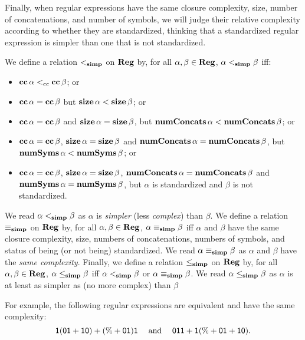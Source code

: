 Finally, when regular expressions have the same closure complexity,
size, number of concatenations, and number of symbols, we will judge
their relative complexity according to whether they are standardized,
thinking that a standardized regular expression is simpler than one
that is not standardized.

We define a relation $\mathrel{<_{\mathbf{simp}}}$ on $\mathbf{Reg}$ by, for all $\alpha,\beta\in\mathbf{Reg}$,
$\alpha\mathrel{<_{\mathbf{simp}}}\beta$ iff:
\begin{itemize}
\item $\mathbf{cc}\,\alpha \mathrel{<_{cc}} \mathbf{cc}\,\beta$; or

\item $\mathbf{cc}\,\alpha = \mathbf{cc}\,\beta$ but $\mathbf{size}\,\alpha < \mathbf{size}\,\beta$; or

\item $\mathbf{cc}\,\alpha = \mathbf{cc}\,\beta$ and $\mathbf{size}\,\alpha = \mathbf{size}\,\beta$,
  but $\mathbf{numConcats}\,\alpha < \mathbf{numConcats}\,\beta$; or

\item $\mathbf{cc}\,\alpha = \mathbf{cc}\,\beta$, $\mathbf{size}\,\alpha = \mathbf{size}\,\beta$
  and $\mathbf{numConcats}\,\alpha = \mathbf{numConcats}\,\beta$, but
  $\mathbf{numSyms}\,\alpha < \mathbf{numSyms}\,\beta$; or

\item $\mathbf{cc}\,\alpha = \mathbf{cc}\,\beta$, $\mathbf{size}\,\alpha = \mathbf{size}\,\beta$,
  $\mathbf{numConcats}\,\alpha = \mathbf{numConcats}\,\beta$ and $\mathbf{numSyms}\,\alpha =
  \mathbf{numSyms}\,\beta$, but $\alpha$ is standardized and $\beta$ is
  not standardized.
\end{itemize}

We read $\alpha\mathrel{<_{\mathbf{simp}}}\beta$ as $\alpha$ is \emph{simpler} (less
\emph{complex}) than $\beta$.  We define a relation $\mathrel{\equiv_{\mathbf{simp}}}$ on
$\mathbf{Reg}$ by, for all $\alpha,\beta\in\mathbf{Reg}$, $\alpha\mathrel{\equiv_{\mathbf{simp}}}\beta$ iff
$\alpha$ and $\beta$ have the same closure complexity, size, numbers
of concatenations, numbers of symbols, and status of being (or not
being) standardized.  We read $\alpha\mathrel{\equiv_{\mathbf{simp}}}\beta$ as $\alpha$ and
$\beta$ have the \emph{same complexity}.  Finally, we define a
relation $\mathrel{\leq_{\mathbf{simp}}}$ on $\mathbf{Reg}$ by, for all $\alpha,\beta\in\mathbf{Reg}$,
$\alpha\mathrel{\leq_{\mathbf{simp}}}\beta$ iff $\alpha\mathrel{<_{\mathbf{simp}}}\beta$ or
$\alpha\mathrel{\equiv_{\mathbf{simp}}}\beta$.  We read $\alpha\mathrel{\leq_{\mathbf{simp}}}\beta$ as $\alpha$ is
at least as simpler as (no more complex) than $\beta$

For example, the following regular expressions are equivalent and have
the same complexity:
\begin{displaymath}
\mathsf{1(01 + 10) + (\% + 01)1} \quad\;\allowbreak\mbox{and}\allowbreak\;\quad
\mathsf{011 + 1(\% + 01 + 10)} .  
\end{displaymath}

